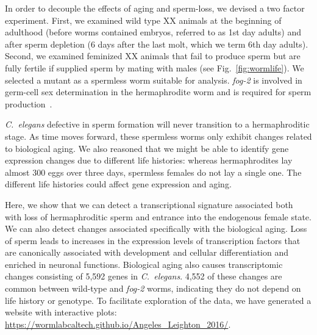\documentclass[10pt,letterpaper,twocolumn]{article}
\newcommand{\cel}{\emph{C.~elegans}}
\newcommand{\fog}{\emph{\mbox{fog-2}}}
\newcommand{\agen}{5,592}
\newcommand{\website}{\url{https://wormlabcaltech.github.io/Angeles_Leighton_2016/}}
\begin{document}
In order to decouple the effects of aging and sperm-loss, we devised a two factor experiment. First, we examined wild type XX animals at the beginning of adulthood (before worms contained embryos, referred to as 1st day adults) and after sperm depletion (6 days after the last molt, which we term 6th day adults). Second, we examined feminized XX animals that fail to produce sperm but are fully fertile if supplied sperm by mating with males (see Fig.~\ref{fig:wormlife}). We selected a mutant as a spermless worm suitable for analysis. \fog{} is involved in germ-cell sex determination in the hermaphrodite worm and is required for sperm production~\cite{Schedl1988,Clifford2000}.

\cel{} defective in sperm formation will never transition to a hermaphroditic stage. As time moves forward, these spermless worms only exhibit changes related to biological aging. We also reasoned that we might be able to identify gene expression changes due to different life histories: whereas hermaphrodites lay almost 300 eggs over three days, spermless females do not lay a single one. The different life histories could affect gene expression and aging.

Here, we show that we can detect a transcriptional signature associated both with loss of hermaphroditic sperm and entrance into the endogenous female state. We can also detect changes associated specifically with the biological aging. Loss of sperm leads to increases in the expression levels of transcription factors that are canonically associated with development and cellular differentiation and enriched in neuronal functions.
Biological aging also causes transcriptomic changes consisting of \agen{} genes in \cel{}. 4,552 of these changes are common between wild-type and \fog{} worms, indicating they do not depend on life history or genotype. To facilitate exploration of the data, we have generated a website with interactive plots: \website{}.
\end{document}
